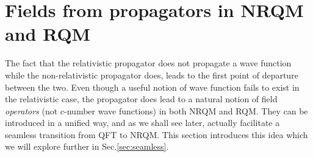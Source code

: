 \documentclass[12pt]{article}
\begin{document}
 
 \section{Fields from propagators in NRQM and RQM}\label{sec:ffrpr}
 
 The fact that the relativistic propagator does not propagate a wave function while the non-relativistic propagator does, leads to the first point of departure between the two. Even though a useful notion of wave function fails to exist in the relativistic case, the propagator does lead to a natural notion of field \textit{operators} (not c-number wave functions) in both NRQM and RQM. They can be introduced in a unified way, and as we shall see later, actually facilitate a seamless transition from QFT to NRQM. This section introduces this idea which we will explore further in Sec.\ref{sec:seamless}. 
 
\end{document}
